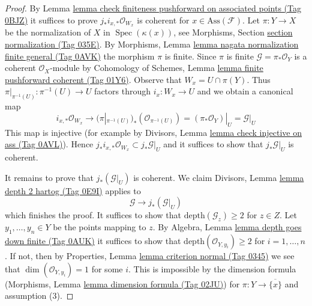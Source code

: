 \documentclass{amsart}
\theoremstyle{plain}
\theoremstyle{definition}
\theoremstyle{remark}
\numberwithin{equation}{subsection}
\def\Spec{\mathop{\mathrm{Spec}}}
\begin{document}
\begin{proof}
By Lemma \href{https://stacks.math.columbia.edu/tag/0BJZ}{lemma check finiteness pushforward on associated points (Tag 0BJZ)}
it suffices to prove $j_*i_{x, *}\mathcal{O}_{W_x}$ is coherent
for $x \in \text{Ass}(\mathcal{F})$.
Let $\pi : Y \to X$ be the normalization of $X$ in $\Spec(\kappa(x))$, see
Morphisms, Section \href{https://stacks.math.columbia.edu/tag/035E}{section normalization (Tag 035E)}. By
Morphisms, Lemma \href{https://stacks.math.columbia.edu/tag/0AVK}{lemma nagata normalization finite general (Tag 0AVK)}
the morphism $\pi$ is finite. Since $\pi$ is finite
$\mathcal{G} = \pi_*\mathcal{O}_Y$ is a coherent $\mathcal{O}_X$-module by
Cohomology of Schemes, Lemma \href{https://stacks.math.columbia.edu/tag/01Y6}{lemma finite pushforward coherent (Tag 01Y6)}.
Observe that $W_x = U \cap \pi(Y)$. Thus
$\pi|_{\pi^{-1}(U)} : \pi^{-1}(U) \to U$ factors through $i_x : W_x \to U$
and we obtain a canonical map
$$
i_{x, *}\mathcal{O}_{W_x}
\longrightarrow
(\pi|_{\pi^{-1}(U)})_*(\mathcal{O}_{\pi^{-1}(U)}) =
(\pi_*\mathcal{O}_Y)|_U = \mathcal{G}|_U
$$
This map is injective (for example by Divisors, Lemma
\href{https://stacks.math.columbia.edu/tag/0AVL}{lemma check injective on ass (Tag 0AVL)}). Hence
$j_*i_{x, *}\mathcal{O}_{W_x} \subset j_*\mathcal{G}|_U$
and it suffices to show that $j_*\mathcal{G}|_U$ is coherent.

\medskip\noindent
It remains to prove that $j_*(\mathcal{G}|_U)$ is coherent. We claim
Divisors, Lemma \href{https://stacks.math.columbia.edu/tag/0E9I}{lemma depth 2 hartog (Tag 0E9I)}
applies to
$$
\mathcal{G} \longrightarrow j_*(\mathcal{G}|_U)
$$
which finishes the proof. It suffices to show that
$\text{depth}(\mathcal{G}_z) \geq 2$ for $z \in Z$.
Let $y_1, \ldots, y_n \in Y$ be the points mapping to $z$.
By Algebra, Lemma \href{https://stacks.math.columbia.edu/tag/0AUK}{lemma depth goes down finite (Tag 0AUK)}
it suffices to show that
$\text{depth}(\mathcal{O}_{Y, y_i}) \geq 2$ for $i = 1, \ldots, n$.
If not, then by Properties, Lemma \href{https://stacks.math.columbia.edu/tag/0345}{lemma criterion normal (Tag 0345)}
we see that $\dim(\mathcal{O}_{Y, y_i}) = 1$ for some $i$.
This is impossible by the dimension formula
(Morphisms, Lemma \href{https://stacks.math.columbia.edu/tag/02JU}{lemma dimension formula (Tag 02JU)})
for $\pi : Y \to \overline{\{x\}}$ and assumption (3).
\end{proof}
\end{document}
